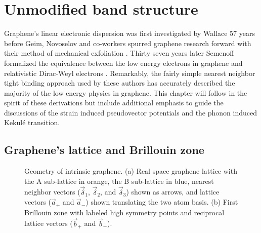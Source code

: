 \chapter{Unmodified band structure\label{chap:TB}}

Graphene's linear electronic dispersion was first investigated by Wallace \cite{Wallace1947} 57 years before Geim, Novoselov and co-workers spurred graphene research forward with their method of mechanical exfoliation \cite{Novoselov2004}.
Thirty seven years later Semenoff formalized the equivalence between the low energy electrons in graphene and relativistic Dirac-Weyl electrons \cite{Semenoff1984}.
Remarkably, the fairly simple nearest neighbor tight binding approach used by these authors has accurately described the majority of the low energy physics in graphene.
This chapter will follow in the spirit of these derivations but include additional emphasis to guide the discussions of the strain induced pseudovector potentials and the phonon induced Kekul\'e transition.

\section{Graphene's lattice and Brillouin zone}
\begin{figure}
	\begin{center}
	
	\end{center}
	\caption[Geometry of intrinsic graphene]{\label{fig:TB:geometry} Geometry of intrinsic graphene.  (a) Real space graphene lattice with the A sub-lattice in orange, the B sub-lattice in blue, nearest neighbor vectors ($\vec \delta_1$, $\vec \delta_2$, and $\vec \delta_3$) shown as arrows, and lattice vectors ($\vec a_+$ and $\vec a_-$) shown translating the two atom basis. (b) First Brillouin zone with labeled high symmetry points and reciprocal lattice vectors ($\vec{b}_+$ and $\vec{b}_-$).}
\end{figure}

